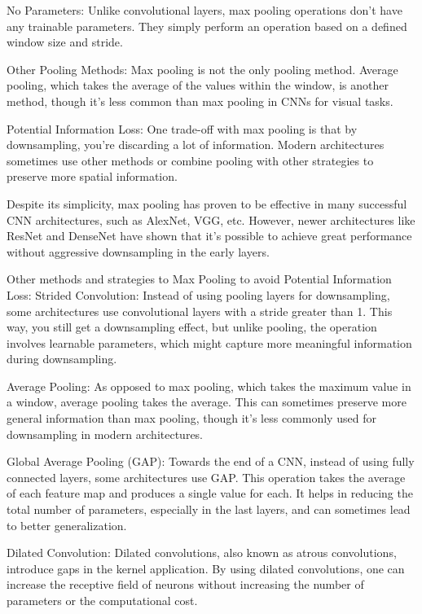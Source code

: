     No Parameters: Unlike convolutional layers, max pooling operations don’t have any trainable parameters. They simply perform an operation based on a defined window size and stride.

    Other Pooling Methods: Max pooling is not the only pooling method. Average pooling, which takes the average of the values within the window, is another method, though it’s less common than max pooling in CNNs for visual tasks.

    Potential Information Loss: One trade-off with max pooling is that by downsampling, you're discarding a lot of information. Modern architectures sometimes use other methods or combine pooling with other strategies to preserve more spatial information.

Despite its simplicity, max pooling has proven to be effective in many successful CNN architectures, such as AlexNet, VGG, etc. However, newer architectures like ResNet and DenseNet have shown that it's possible to achieve great performance without aggressive downsampling in the early layers.


Other methods and strategies to Max Pooling to avoid Potential Information Loss: 
    Strided Convolution: Instead of using pooling layers for downsampling, some architectures use convolutional layers with a stride greater than 1. This way, you still get a downsampling effect, but unlike pooling, the operation involves learnable parameters, which might capture more meaningful information during downsampling.

    Average Pooling: As opposed to max pooling, which takes the maximum value in a window, average pooling takes the average. This can sometimes preserve more general information than max pooling, though it's less commonly used for downsampling in modern architectures.

    Global Average Pooling (GAP): Towards the end of a CNN, instead of using fully connected layers, some architectures use GAP. This operation takes the average of each feature map and produces a single value for each. It helps in reducing the total number of parameters, especially in the last layers, and can sometimes lead to better generalization.

    Dilated Convolution: Dilated convolutions, also known as atrous convolutions, introduce gaps in the kernel application. By using dilated convolutions, one can increase the receptive field of neurons without increasing the number of parameters or the computational cost.

